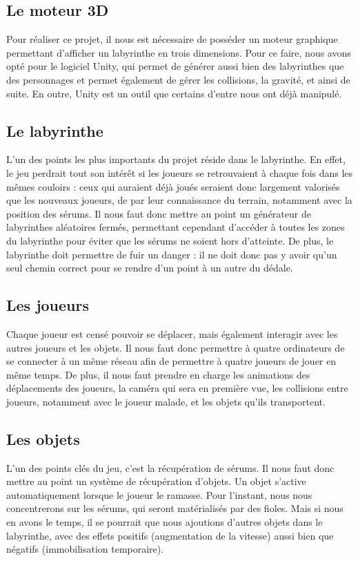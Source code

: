\documentclass{article}
\begin{document}
\subsection{Le moteur 3D}
Pour réaliser ce projet, il nous est nécessaire de posséder un moteur graphique permettant d’afficher un labyrinthe en trois dimensions. Pour ce faire, nous avons opté pour le logiciel Unity, qui permet de générer aussi bien des labyrinthes que des personnages et permet également de gérer les collisions, la gravité, et ainsi de suite. En outre, Unity est un outil que certains d’entre nous ont déjà manipulé.

\subsection{Le labyrinthe}
L’un des points les plus importants du projet réside dans le labyrinthe. En effet, le jeu perdrait tout son intérêt si les joueurs se retrouvaient à chaque fois dans les mêmes couloirs : ceux qui auraient déjà joués seraient donc largement valorisés que les nouveaux joueurs, de par leur connaissance du terrain, notamment avec la position des sérums. Il nous faut donc mettre au point un générateur de labyrinthes aléatoires fermés, permettant cependant d’accéder à toutes les zones du labyrinthe pour éviter que les sérums ne soient hors d’atteinte. De plus, le labyrinthe doit permettre de fuir un danger : il ne doit donc pas y avoir qu’un seul chemin correct pour se rendre d’un point à un autre du dédale.

\subsection{Les joueurs}
Chaque joueur est censé pouvoir se déplacer, mais également interagir avec les autres joueurs et les objets. Il nous faut donc permettre à quatre ordinateurs de se connecter à un même réseau afin de permettre à quatre joueurs de jouer en même temps. De plus, il nous faut prendre en charge les animations des déplacements des joueurs, la caméra qui sera en première vue, les collisions entre joueurs, notamment avec le joueur malade, et les objets qu’ils transportent.

\subsection{Les objets}
L’un des points clés du jeu, c’est la récupération de sérums. Il nous faut donc mettre au point un système de récupération d’objets. Un objet s’active automatiquement lorsque le joueur le ramasse. Pour l’instant, nous nous concentrerons sur les sérums, qui seront matérialisés par des fioles. Mais si nous en avons le temps, il se pourrait que nous ajoutions d’autres objets dans le labyrinthe, avec des effets positifs (augmentation de la vitesse) aussi bien que négatifs (immobilisation temporaire).
\end{document}
